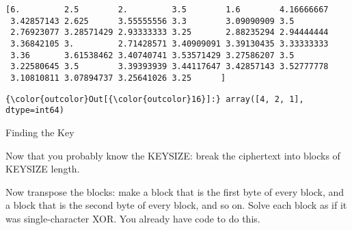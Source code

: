 \documentclass[11pt]{article}
\begin{document}
    \begin{Verbatim}[commandchars=\\\{\}]
[6.         2.5        2.         3.5        1.6        4.16666667
 3.42857143 2.625      3.55555556 3.3        3.09090909 3.5
 2.76923077 3.28571429 2.93333333 3.25       2.88235294 2.94444444
 3.36842105 3.         2.71428571 3.40909091 3.39130435 3.33333333
 3.36       3.61538462 3.40740741 3.53571429 3.27586207 3.5
 3.22580645 3.5        3.39393939 3.44117647 3.42857143 3.52777778
 3.10810811 3.07894737 3.25641026 3.25      ]

    \end{Verbatim}

\begin{Verbatim}[commandchars=\\\{\}]
{\color{outcolor}Out[{\color{outcolor}16}]:} array([4, 2, 1], dtype=int64)
\end{Verbatim}
            
     Finding the Key

Now that you probably know the KEYSIZE: break the ciphertext into blocks
of KEYSIZE length.

Now transpose the blocks: make a block that is the first byte of every
block, and a block that is the second byte of every block, and so on.
Solve each block as if it was single-character XOR. You already have
code to do this.
\end{document}
